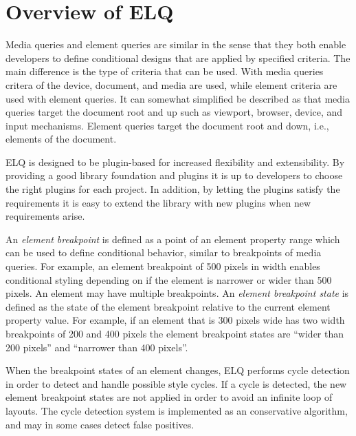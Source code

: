 \documentclass{llncs}
\newcommand{\elq}{ELQ}
\begin{document}
\section{Overview of \elq{}}\label{sec:elq}\label{sec:elq-api}
  Media queries and element queries are similar in the sense that they both enable developers to define conditional designs that are applied by specified criteria.
  The main difference is the type of criteria that can be used.
  With media queries critera of the device, document, and media are used, while element criteria are used with element queries.
  It can somewhat simplified be described as that media queries target the document root and up such as viewport, browser, device, and input mechanisms.
  Element queries target the document root and down, i.e., elements of the document.

  \elq{} is designed to be plugin-based for increased flexibility and extensibility.
  By providing a good library foundation and plugins it is up to developers to choose the right plugins for each project.
  In addition, by letting the plugins satisfy the requirements it is easy to extend the library with new plugins when new requirements arise.

  An \emph{element breakpoint} is defined as a point of an element property range which can be used to define conditional behavior, similar to breakpoints of media queries.
  For example, an element breakpoint of 500 pixels in width enables conditional styling depending on if the element is narrower or wider than 500 pixels.
  An element may have multiple breakpoints.
  An \emph{element breakpoint state} is defined as the state of the element breakpoint relative to the current element property value.
  For example, if an element that is 300 pixels wide has two width breakpoints of 200 and 400 pixels the element breakpoint states are ``wider than 200 pixels'' and ``narrower than 400 pixels''.

  When the breakpoint states of an element changes, \elq{} performs cycle detection in order to detect and handle possible style cycles.
  If a cycle is detected, the new element breakpoint states are not applied in order to avoid an infinite loop of layouts.
  The cycle detection system is implemented as an conservative algorithm, and may in some cases detect false positives.
\end{document}
